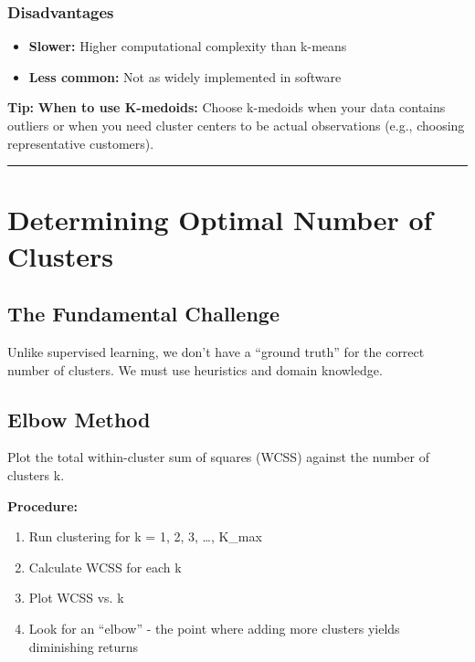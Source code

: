 \documentclass[
]{article}
\begin{document}
\subsubsection{Disadvantages}

\begin{itemize}
\item
  \textbf{Slower:} Higher computational complexity than k-means
\item
  \textbf{Less common:} Not as widely implemented in software
\end{itemize}

\textbf{Tip: } \textbf{When to use K-medoids:} Choose k-medoids when
your data contains outliers or when you need cluster centers to be
actual observations (e.g., choosing representative customers).

\begin{center}\rule{0.5\linewidth}{0.5pt}\end{center}

\textbf{ }

\section{Determining Optimal Number of Clusters}

\textbf{ }

\subsection{The Fundamental Challenge}

Unlike supervised learning, we don't have a ``ground truth'' for the
correct number of clusters. We must use heuristics and domain knowledge.

\textbf{ }

\subsection{Elbow Method}

Plot the total within-cluster sum of squares (WCSS) against the number
of clusters k.

\textbf{Procedure:}

\begin{enumerate}
\item
  Run clustering for k = 1, 2, 3, \ldots, K\_max
\item
  Calculate WCSS for each k
\item
  Plot WCSS vs. k
\item
  Look for an ``elbow'' - the point where adding more clusters yields
  diminishing returns
\end{enumerate}
\end{document}
